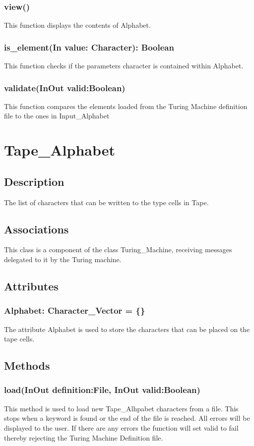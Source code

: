 \documentclass{report}
\begin{document}
    \subsubsection{view()}
    This function displays the contents of Alphabet.
    
    \subsubsection{is\_element(In value: Character): Boolean}
    This function checks if the parameters character is contained within Alphabet.
    
    \subsubsection{validate(InOut valid:Boolean)}
    This function compares the elements loaded from the Turing Machine definition file to the ones in Input\_Alphabet
    
    
    
    
    
      \section{Tape\_Alphabet}
	\subsection{Description}
    The list of characters that can be written to the type cells in Tape. 
    \subsection{Associations} 
     This class is a component of the class Turing\_Machine, receiving messages delegated to it by the Turing machine.
    \subsection{Attributes} 
    \subsubsection{Alphabet: Character\_Vector = \{\}}
    The attribute Alphabet is used to store the characters that can be placed on the tape cells.
    \subsection{Methods} 
    \subsubsection{load(InOut definition:File, InOut valid:Boolean)}
    This method is used to load new Tape\_Alhpabet characters from a file. This stops when a keyword is found or the end of the file is reached. All errors will be displayed to the user. If there are any errors the function will set valid to fail thereby rejecting the Turing Machine Definition file. 
    
\end{document}

